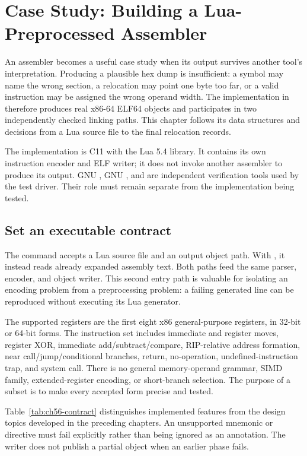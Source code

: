 \chapter{Case Study: Building a Lua-Preprocessed Assembler}
\label{ch:lua-assembler}

An assembler becomes a useful case study when its output survives another tool's interpretation.
Producing a plausible hex dump is insufficient: a symbol may name the wrong section, a relocation may point one byte too far, or a valid instruction may be assigned the wrong operand width.
The implementation in  therefore produces real x86-64 ELF64 objects and participates in two independently checked linking paths.
This chapter follows its data structures and decisions from a Lua source file to the final relocation records.

The implementation is C11 with the Lua 5.4 library.
It contains its own instruction encoder and ELF writer; it does not invoke another assembler to produce its output.
GNU , GNU , and  are independent verification tools used by the test driver.
Their role must remain separate from the implementation being tested.

\section{Set an executable contract}
\label{sec:ch56-contract}

The command accepts a Lua source file and an output object path.
With , it instead reads already expanded assembly text.
Both paths feed the same parser, encoder, and object writer.
This second entry path is valuable for isolating an encoding problem from a preprocessing problem: a failing generated line can be reproduced without executing its Lua generator.

The supported registers are the first eight x86 general-purpose registers, in 32-bit or 64-bit forms.
The instruction set includes immediate and register moves, register XOR, immediate add/subtract/compare, RIP-relative address formation, near call/jump/conditional branches, return, no-operation, undefined-instruction trap, and system call.
There is no general memory-operand grammar, SIMD family, extended-register encoding, or short-branch selection.
The purpose of a subset is to make every accepted form precise and tested.

Table~\ref{tab:ch56-contract} distinguishes implemented features from the design topics developed in the preceding chapters.
An unsupported mnemonic or directive must fail explicitly rather than being ignored as an annotation.
The writer does not publish a partial object when an earlier phase fails.

